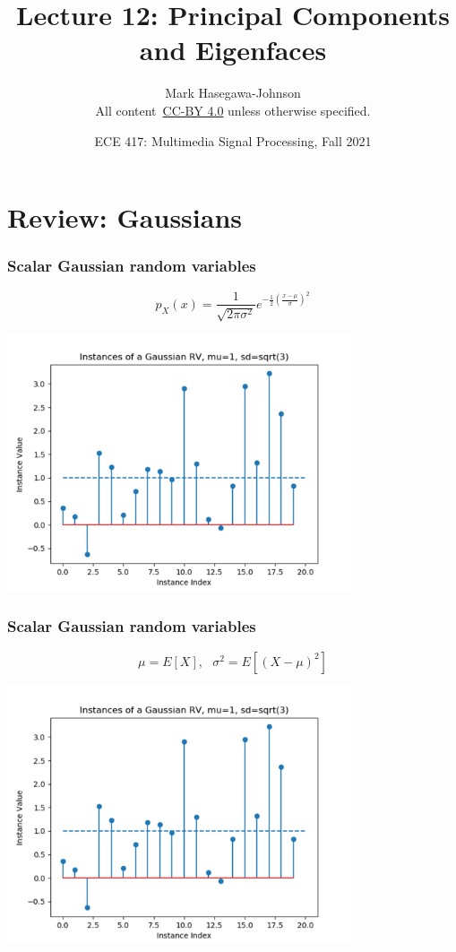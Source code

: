 \documentclass{beamer}
\title{Lecture 12: Principal Components and Eigenfaces}
\author{Mark Hasegawa-Johnson\\All content~\href{https://creativecommons.org/licenses/by/4.0/}{CC-BY 4.0} unless otherwise specified.}
\date{ECE 417: Multimedia Signal Processing, Fall 2021}
\begin{document}
\begin{frame}
  \maketitle
\end{frame}

\begin{frame}
  \tableofcontents
\end{frame}

\section[Review]{Review: Gaussians}
\setcounter{subsection}{1}

\begin{frame}
  \frametitle{Scalar Gaussian random variables}
  \[
  p_X(x) = \frac{1}{\sqrt{2\pi\sigma^2}}e^{-\frac{1}{2}\left(\frac{x-\mu}{\sigma}\right)^2}
  \]
  \centerline{\includegraphics[height=3in]{gaussian_instances.png}}
\end{frame}

\begin{frame}
  \frametitle{Scalar Gaussian random variables}
  \[
  \mu=E[X],~~~\sigma^2=E[(X-\mu)^2]
  \]
  \centerline{\includegraphics[height=3in]{gaussian_instances.png}}
\end{frame}
\end{document}
